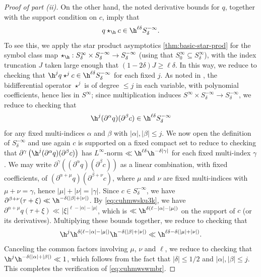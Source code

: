 \begin{proof}[Proof of part (ii)]
  On the other hand, the noted derivative bounds for $q$, together with the support condition on $c$, imply that
  \begin{equation}\label{eq:cuhmwswmbr}
    q \star_{\h} c \in \h^{\ell \delta} S_\delta^{-\infty}.
  \end{equation}
  To see this, we apply the star product asymptotics \ref{thm:basic-star-prod} for the symbol class map \(\star_{\h} : S_\delta^\infty \times S_\delta^{- \infty} \rightarrow S_\delta^{- \infty}\) (using that \(S_0^\infty \subseteq S_\delta^\infty\)), with the index truncation \(J\) taken large enough that \((1 - 2 \delta) J \geq \ell \delta\).  In this way, we reduce to checking that \(\h^j q \star^j c \in \h^{\ell \delta} S_\delta^{-\infty}\) for each fixed \(j\).  As noted in \cite[\S4.2]{nelson-venkatesh-1}, the bidifferential operator \(\star^j\) is of degree \(\leq j\) in each variable, with polynomial coefficients, hence lies in \(S^\infty\); since multiplication induces \(S^\infty \times S_\delta^{- \infty} \rightarrow S_\delta^{- \infty}\), we reduce to checking that
  \begin{equation*}
    \h^j (\partial^\alpha q)(\partial^\beta c) \in \h^{\ell \delta} S_\delta^{- \infty}
  \end{equation*}
  for any fixed multi-indices \(\alpha\) and \(\beta\) with \(\lvert \alpha \rvert, \lvert \beta \rvert \leq j\).  We now open the definition of \(S_\delta^{- \infty}\) and use again \(c\) is supported on a fixed compact set to reduce to checking that \(\partial^\gamma \left( \h^j(\partial^\alpha q)(\partial^\beta c) \right)\) has \(L^\infty\)-norm \(\ll \h^{\ell \delta} \h^{- \delta \lvert \gamma \rvert}\) for each fixed multi-index \(\gamma\).  We may write \(\partial^\gamma \left( (\partial^\alpha q)(\partial^\beta c) \right)\) as a linear combination, with fixed coefficients, of \((\partial^{\alpha + \mu} q)(\partial^{\beta + \nu} c)\), where \(\mu\) and \(\nu\) are fixed multi-indices with \(\mu + \nu = \gamma\), hence \(\lvert \mu \rvert + \lvert \nu \rvert = \lvert \gamma \rvert\).  Since \(c \in S_\delta^{-\infty}\), we have \(\partial^{\beta + \nu}(\tau + \xi) \ll \h^{- \delta(\lvert \beta \rvert + \lvert \nu \rvert)}\).  By \eqref{eq:cuhmwsku3k}, we have \(\partial^{\alpha + \mu} q(\tau + \xi) \ll \lvert \xi \rvert^{\ell - \lvert \alpha \rvert - \lvert \mu \rvert}\), which is \(\ll \h^{\delta \left( \ell - \lvert \alpha \rvert - \lvert \mu \rvert \right)}\) on the support of \(c\) (or its derivatives).  Multiplying these bounds together, we reduce to checking that
  \begin{equation*}
    \h^j \h^{\delta(\ell - \lvert \alpha \rvert - \lvert \mu \rvert)} \h^{- \delta(\lvert \beta \rvert + \lvert \nu \rvert)} \ll \h^{\ell \delta - \delta(\lvert \mu \rvert + \lvert \nu \rvert)}.
  \end{equation*}
  Canceling the common factors involving \(\mu\), \(\nu\) and \(\ell\), we reduce to checking that \(\h^j \h^{- \delta(\lvert \alpha \rvert + \lvert \beta \rvert)} \ll 1\), which follows from the fact that \(\lvert \delta \rvert \leq 1/2\) and \(\lvert \alpha \rvert, \lvert \beta \rvert \leq j\).  This completes the verification of \eqref{eq:cuhmwswmbr}.


\end{proof}
